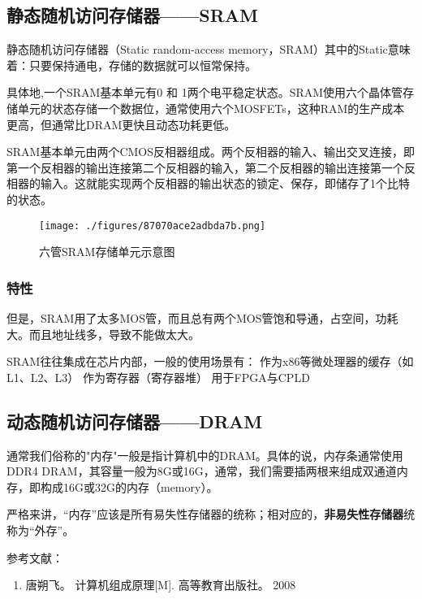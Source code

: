 \subsection{静态随机访问存储器——SRAM}

静态随机访问存储器（Static random-access memory，SRAM）其中的Static意味着：只要保持通电，存储的数据就可以恒常保持。

具体地,一个SRAM基本单元有0 和 1两个电平稳定状态。SRAM使用六个晶体管存储单元的状态存储一个数据位，通常使用六个MOSFETs，这种RAM的生产成本更高，但通常比DRAM更快且动态功耗更低。

SRAM基本单元由两个CMOS反相器组成。两个反相器的输入、输出交叉连接，即第一个反相器的输出连接第二个反相器的输入，第二个反相器的输出连接第一个反相器的输入。这就能实现两个反相器的输出状态的锁定、保存，即储存了1个比特的状态。

\begin{figure}[ht]
\centering
\texttt{[image: ./figures/87070ace2adbda7b.png]}
\caption{六管SRAM存储单元示意图} \label{fig_RAM_3}
\end{figure}

\subsubsection{特性}


但是，SRAM用了太多MOS管，而且总有两个MOS管饱和导通，占空间，功耗大。而且地址线多，导致不能做太大。

SRAM往往集成在芯片内部，一般的使用场景有：
作为x86等微处理器的缓存（如L1、L2、L3）
作为寄存器（寄存器堆）
用于FPGA与CPLD

\subsection{动态随机访问存储器——DRAM}


通常我们俗称的"内存"一般是指计算机中的DRAM。具体的说，内存条通常使用DDR4 DRAM，其容量一般为8G或16G，通常，我们需要插两根来组成双通道内存，即构成16G或32G的内存（memory）。

严格来讲，“内存”应该是所有易失性存储器的统称；相对应的，\textbf{非易失性存储器}统称为“外存”。






参考文献：
\begin{enumerate}
\item 唐朔飞。 计算机组成原理[M]. 高等教育出版社。 2008
\end{enumerate}
